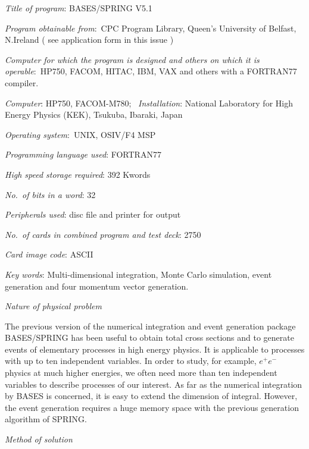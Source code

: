 
{\footnotesize
\noindent
{\it Title of program}: BASES/SPRING V5.1
\par
\smallskip
\noindent
{\it Program obtainable from}:~CPC Program Library, Queen's University
of Belfast, N.Ire\-land ( see application form in this issue )
\par
\smallskip
\noindent
{\it Computer for which the program is designed and others on which it is 
operable}:~HP750, FACOM, HITAC, IBM, VAX and others with a FORTRAN77 compiler.
\par
\smallskip
\noindent
{\it Computer}: HP750, FACOM-M780; ~{\it Installation}: National Laboratory for
High Energy Physics (KEK), Tsuku\-ba, Ibaraki, Japan
\par
\smallskip
\noindent
{\it Operating system}:~UNIX, OSIV/F4 MSP
\par
\smallskip
\noindent
{\it Programming language used}: FORTRAN77
\par
\smallskip
\noindent
{\it High speed storage required}: 392 Kwords 
\par
\smallskip
\noindent
{\it No.~of bits in a word}: 32
\par
\smallskip
\noindent
{\it Peripherals used}: disc file and printer for output
\par
\smallskip
\noindent
{\it No.~of cards in combined program and test deck}: 2750
\par
\smallskip
\noindent
{\it Card image code}: ASCII
\par
\smallskip
\noindent
{\it Key words}: Multi-dimensional integration, Monte Carlo simulation,
 event generation and four momentum vector generation.
\par
\smallskip
\noindent
{\it Nature of physical problem}
\par
\noindent
The previous version of the numerical integration and event generation package
BASES/SPRING has been useful to obtain  total cross sections and to generate 
events of elementary processes in high energy physics. It is applicable to
processes with up to ten independent variables. 
In order to study, for example, $e^+e^-$ physics at much higher
energies, we often need more than ten independent variables to
describe  processes of our interest. 
As far as  the numerical integration by BASES is concerned, it is
easy to extend the dimension of integral. 
However, the event generation requires a huge memory space with the previous 
generation algorithm of SPRING. \par
\smallskip
\noindent
{\it Method of solution}
}
